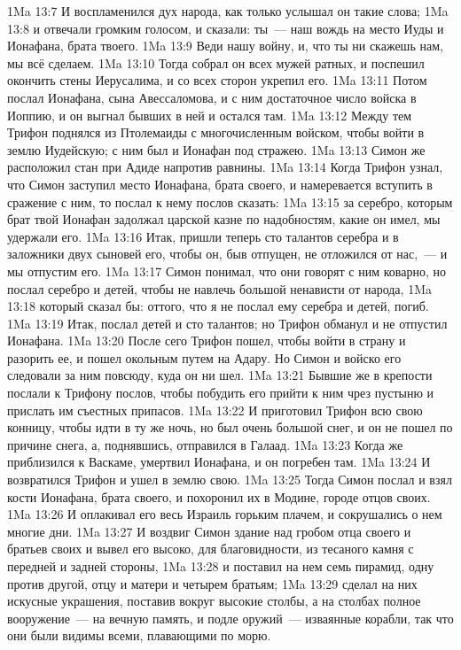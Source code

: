 \vs 1Ma 13:7 И воспламенился дух народа, как только услышал он такие слова;
\vs 1Ma 13:8 и отвечали громким голосом, и сказали: ты~--- наш вождь на место Иуды и Ионафана, брата твоего.
\vs 1Ma 13:9 Веди нашу войну, и, что ты ни скажешь нам, мы всё сделаем.
\vs 1Ma 13:10 Тогда собрал он всех мужей ратных, и поспешил окончить стены Иерусалима, и со всех сторон укрепил его.
\vs 1Ma 13:11 Потом послал Ионафана, сына Авессаломова, и с ним достаточное число войска в Иоппию, и он выгнал бывших в ней и остался там.
\rsbpar\vs 1Ma 13:12 Между тем Трифон поднялся из Птолемаиды с многочисленным войском, чтобы войти в землю Иудейскую; с ним был и Ионафан под стражею.
\vs 1Ma 13:13 Симон же расположил стан при Адиде напротив равнины.
\vs 1Ma 13:14 Когда Трифон узнал, что Симон заступил место Ионафана, брата своего, и намеревается вступить в сражение с ним, то послал к нему послов сказать:
\vs 1Ma 13:15 за серебро, которым брат твой Ионафан задолжал царской казне по надобностям, какие он имел, мы удержали его.
\vs 1Ma 13:16 Итак, пришли теперь сто талантов серебра и в заложники двух сыновей его, чтобы он, быв отпущен, не отложился от нас,~--- и мы отпустим его.
\vs 1Ma 13:17 Симон понимал, что они говорят с ним коварно, но послал серебро и детей, чтобы не навлечь большой ненависти от народа,
\vs 1Ma 13:18 который сказал бы: оттого, что я не послал ему серебра и детей,  погиб.
\vs 1Ma 13:19 Итак, послал детей и сто талантов; но Трифон обманул и не отпустил Ионафана.
\vs 1Ma 13:20 После сего Трифон пошел, чтобы войти в страну и разорить ее, и пошел окольным путем на Адару. Но Симон и войско его следовали за ним повсюду, куда он ни шел.
\vs 1Ma 13:21 Бывшие же в крепости послали к Трифону послов, чтобы побудить его прийти к ним чрез пустыню и прислать им съестных припасов.
\vs 1Ma 13:22 И приготовил Трифон всю свою конницу, чтобы идти в ту же ночь, но был очень большой снег, и он не пошел по причине снега, а, поднявшись, отправился в Галаад.
\vs 1Ma 13:23 Когда же приблизился к Васкаме, умертвил Ионафана, и он погребен там.
\vs 1Ma 13:24 И возвратился Трифон и ушел в землю свою.
\vs 1Ma 13:25 Тогда Симон послал и взял кости Ионафана, брата своего, и похоронил их в Модине, городе отцов своих.
\vs 1Ma 13:26 И оплакивал его весь Израиль горьким плачем, и сокрушались о нем многие дни.
\vs 1Ma 13:27 И воздвиг Симон здание над гробом отца своего и братьев своих и вывел его высоко, для благовидности, из тесаного камня с передней и задней стороны,
\vs 1Ma 13:28 и поставил на нем семь пирамид, одну против другой, отцу и матери и четырем братьям;
\vs 1Ma 13:29 сделал на них искусные украшения, поставив вокруг высокие столбы, а на столбах полное вооружение~--- на вечную память, и подле оружий~--- изваянные корабли, так что они были видимы всеми, плавающими по морю.
